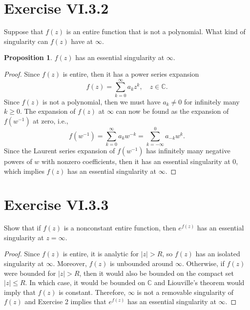 \documentclass[12pt]{article}
\newenvironment{pbox}
    {\begin{lrbox}{\mybox}\begin{minipage}{0.98\textwidth}}
    {\end{minipage}\end{lrbox}\begin{center}\framebox[\textwidth]{\usebox{\mybox}}\end{center}}
\theoremstyle{definition}
\newtheorem{proposition}{Proposition}
\newcommand{\C}{\mathbb{C}}
\begin{document}
\newpage
\section{Exercise VI.3.2}
\begin{pbox}
    Suppose that $f(z)$ is an entire function that is not a polynomial. What kind of singularity can $f(z)$ have at $\infty$.
\end{pbox}

\begin{proposition}
    $f(z)$ has an essential singularity at $\infty$.
\end{proposition}

\begin{proof}
    Since $f(z)$ is entire, then it has a power series expansion
    \[
        f(z) = \sum_{k=0}^\infty a_k z^k, \quad z \in \C.
    \]
    Since $f(z)$ is not a polynomial, then we must have $a_k \ne 0$ for infinitely many $k \geq 0$. The expansion of $f(z)$ at $\infty$ can now be found as the expansion of $f(w^{-1})$ at zero, i.e.,
    \[
        f(w^{-1}) = \sum_{k=0}^\infty a_k w^{-k} = \sum_{k=-\infty}^0 a_{-k} w^k.
    \]
    Since the Laurent series expansion of $f(w^{-1})$ has infinitely many negative powers of $w$ with nonzero coefficients, then it has an essential singularity at $0$, which implies $f(z)$ has an essential singularity at $\infty$.
    
\end{proof}

\section{Exercise VI.3.3}
\begin{pbox}
    Show that if $f(z)$ is a nonconstant entire function, then $e^{f(z)}$ has an essential singularity at $z = \infty$.
\end{pbox}

\begin{proof}
    Since $f(z)$ is entire, it is analytic for $|z| > R$, so $f(z)$ has an isolated singularity at $\infty$. Moreover, $f(z)$ is unbounded around $\infty$. Otherwise, if $f(z)$ were bounded for $|z| > R$, then it would also be bounded on the compact set $|z| \leq R$. In which case, it would be bounded on $\C$ and Liouville's theorem would imply that $f(z)$ is constant. Therefore, $\infty$ is not a removable singularity of $f(z)$ and Exercise 2 implies that $e^{f(z)}$ has an essential singularity at $\infty$.
\end{proof}
\end{document}
